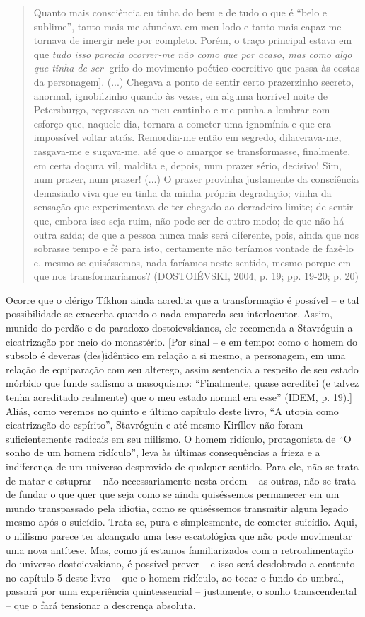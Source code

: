 \begin{quote}
Quanto mais consciência eu tinha do bem e de tudo o que é ``belo e
sublime'', tanto mais me afundava em meu lodo e tanto mais capaz me
tornava de imergir nele por completo. Porém, o traço principal estava em
que \emph{tudo isso parecia ocorrer-me não como que por acaso, mas como
algo que tinha de ser} {[}grifo do movimento poético coercitivo que
passa às costas da personagem{]}. (...) Chegava a ponto de sentir certo
prazerzinho secreto, anormal, ignobilzinho quando às vezes, em alguma
horrível noite de Petersburgo, regressava ao meu cantinho e me punha a
lembrar com esforço que, naquele dia, tornara a cometer uma ignomínia e
que era impossível voltar atrás. Remordia-me então em segredo,
dilacerava-me, rasgava-me e sugava-me, até que o amargor se
transformasse, finalmente, em certa doçura vil, maldita e, depois, num
prazer sério, decisivo! Sim, num prazer, num prazer! (...) O prazer
provinha justamente da consciência demasiado viva que eu tinha da minha
própria degradação; vinha da sensação que experimentava de ter chegado
ao derradeiro limite; de sentir que, embora isso seja ruim, não pode ser
de outro modo; de que não há outra saída; de que a pessoa nunca mais
será diferente, pois, ainda que nos sobrasse tempo e fé para isto,
certamente não teríamos vontade de fazê-lo e, mesmo se quiséssemos, nada
faríamos neste sentido, mesmo porque em que nos transformaríamos?
(DOSTOIÉVSKI, 2004, p. 19; pp. 19-20; p. 20)
\end{quote}

Ocorre que o clérigo Tíkhon ainda acredita que a transformação é
possível -- e tal possibilidade se exacerba quando o nada empareda seu
interlocutor. Assim, munido do perdão e do paradoxo dostoievskianos, ele
recomenda a Stavróguin a cicatrização por meio do monastério. {[}Por
sinal -- e em tempo: como o homem do subsolo é deveras (des)idêntico em
relação a si mesmo, a personagem, em uma relação de equiparação com seu
alterego, assim sentencia a respeito de seu estado mórbido que funde
sadismo a masoquismo: ``Finalmente, quase acreditei (e talvez tenha
acreditado realmente) que o meu estado normal era esse'' (IDEM, p.
19).{]} Aliás, como veremos no quinto e último capítulo deste livro, ``A
utopia como cicatrização do espírito'', Stavróguin e até mesmo Kiríllov
não foram suficientemente radicais em seu niilismo. O homem ridículo,
protagonista de ``O sonho de um homem ridículo'', leva às últimas
consequências a frieza e a indiferença de um universo desprovido de
qualquer sentido. Para ele, não se trata de matar e estuprar -- não
necessariamente nesta ordem -- as outras, não se trata de fundar o que
quer que seja como se ainda quiséssemos permanecer em um mundo
transpassado pela idiotia, como se quiséssemos transmitir algum legado
mesmo após o suicídio. Trata-se, pura e simplesmente, de cometer
suicídio. Aqui, o niilismo parece ter alcançado uma tese escatológica
que não pode movimentar uma nova antítese. Mas, como já estamos
familiarizados com a retroalimentação do universo dostoievskiano, é
possível prever -- e isso será desdobrado a contento no capítulo 5 deste
livro -- que o homem ridículo, ao tocar o fundo do umbral, passará por
uma experiência quintessencial -- justamente, o sonho transcendental --
que o fará tensionar a descrença absoluta.

